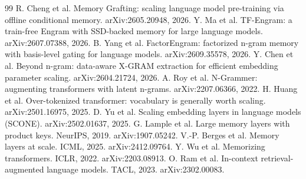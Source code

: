 \documentclass[11pt]{article}
\begin{document}
\begin{thebibliography}{99}
 R. Cheng et al. Memory Grafting: scaling language model pre-training via offline conditional memory. arXiv:2605.20948, 2026.
 Y. Ma et al. TF-Engram: a train-free Engram with SSD-backed memory for large language models. arXiv:2607.07388, 2026.
 B. Yang et al. FactorEngram: factorized n-gram memory with basis-level gating for language models. arXiv:2609.35578, 2026.
 Y. Chen et al. Beyond n-gram: data-aware X-GRAM extraction for efficient embedding parameter scaling. arXiv:2604.21724, 2026.
 A. Roy et al. N-Grammer: augmenting transformers with latent n-grams. arXiv:2207.06366, 2022.
 H. Huang et al. Over-tokenized transformer: vocabulary is generally worth scaling. arXiv:2501.16975, 2025.
 D. Yu et al. Scaling embedding layers in language models (SCONE). arXiv:2502.01637, 2025.
 G. Lample et al. Large memory layers with product keys. NeurIPS, 2019. arXiv:1907.05242.
 V.-P. Berges et al. Memory layers at scale. ICML, 2025. arXiv:2412.09764.
 Y. Wu et al. Memorizing transformers. ICLR, 2022. arXiv:2203.08913.
 O. Ram et al. In-context retrieval-augmented language models. TACL, 2023. arXiv:2302.00083.
\end{thebibliography}
\end{document}
